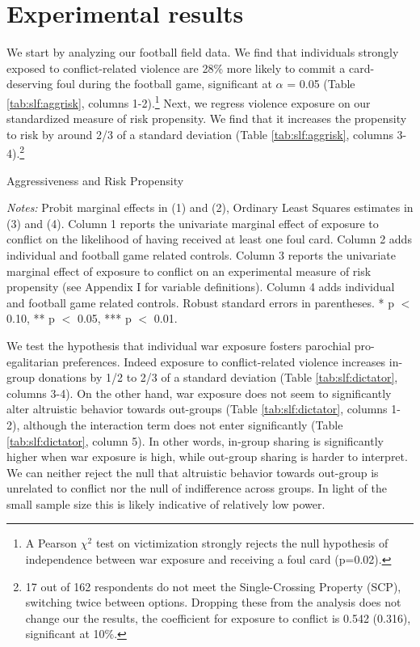 \section{Experimental results}
\label{sec:slf:results}
We start by analyzing our football field data. We find that individuals strongly exposed to conflict-related violence are 28\% more likely to commit a card-deserving foul during the football game, significant at $\alpha$ = 0.05 (Table \ref{tab:slf:aggrisk}, columns 1-2).\footnote{A Pearson $\chi^2$ test on victimization strongly rejects the null hypothesis of independence between war exposure and receiving a foul card (p=0.02).}  Next, we regress violence exposure on our standardized measure of risk propensity. We find that it increases the propensity to risk by around 2/3 of a standard deviation (Table \ref{tab:slf:aggrisk}, columns 3-4).\footnote{17 out of 162 respondents do not meet the Single-Crossing Property (SCP), switching twice between options. Dropping these from the analysis does not change our the results, the coefficient for exposure to conflict is 0.542 (0.316), significant at 10\%.} 

\begin{threeparttable}[htb]
	\caption{Aggressiveness and Risk Propensity}
	\label{tab:slf:aggrisk}
	\centering
	\tiny
	
	\begin{tablenotes}
		\item \textit{Notes:} Probit marginal effects in (1) and (2), Ordinary Least Squares estimates in (3) and (4). Column 1 reports the univariate marginal effect of exposure to conflict on the likelihood of having received at least one foul card. Column 2 adds individual and football game related controls. Column 3 reports the univariate marginal effect of exposure to conflict on an experimental measure of risk propensity (see Appendix I for variable definitions). Column 4 adds individual and football game related controls. Robust standard errors in parentheses. * p $<$ 0.10, ** p $<$ 0.05, *** p $<$ 0.01.
		\item
	\end{tablenotes}
\end{threeparttable}

We test the hypothesis that individual war exposure fosters parochial pro-egalitarian preferences. Indeed exposure to conflict-related violence increases in-group donations by 1/2 to 2/3 of a standard deviation (Table \ref{tab:slf:dictator}, columns 3-4). On the other hand, war exposure does not seem to significantly alter altruistic behavior towards out-groups (Table \ref{tab:slf:dictator}, columns 1-2), although the interaction term does not enter significantly (Table \ref{tab:slf:dictator}, column 5). In other words, in-group sharing is significantly higher when war exposure is high, while out-group sharing is harder to interpret. We can neither reject the null that altruistic behavior towards out-group is unrelated to conflict nor the null of indifference across groups. In light of the small sample size this is likely indicative of relatively low power.

